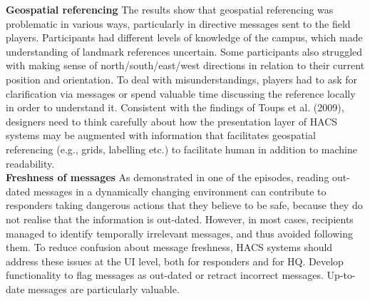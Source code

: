\textbf{Geospatial referencing} The results show that geospatial referencing was problematic in various ways, particularly in directive messages sent to the field players. Participants had different levels of knowledge of the campus, which made understanding of landmark references uncertain. Some participants also struggled with making sense of north/south/east/west directions in relation to their current position and orientation. To deal with misunderstandings, players had to ask for clarification via messages or spend valuable time discussing the reference locally in order to understand it. Consistent with the findings of Toups et al. (2009), designers need to think carefully about how the presentation layer of \ac{HACS} systems may be augmented with information that facilitates geospatial referencing (e.g., grids, labelling etc.) to facilitate human in addition to machine readability. \\


\textbf{Freshness of messages} As demonstrated in one of the episodes, reading out-dated messages in a dynamically changing environment can contribute to responders taking dangerous actions that they believe to be safe, because they do not realise that the information is out-dated. However, in most cases, recipients managed to identify temporally irrelevant messages, and thus avoided following them. To reduce confusion about message freshness, \ac{HACS} systems should address these issues at the UI level, both for responders and for HQ. Develop functionality to flag messages as out-dated or retract incorrect messages. Up-to-date messages are particularly valuable. 



